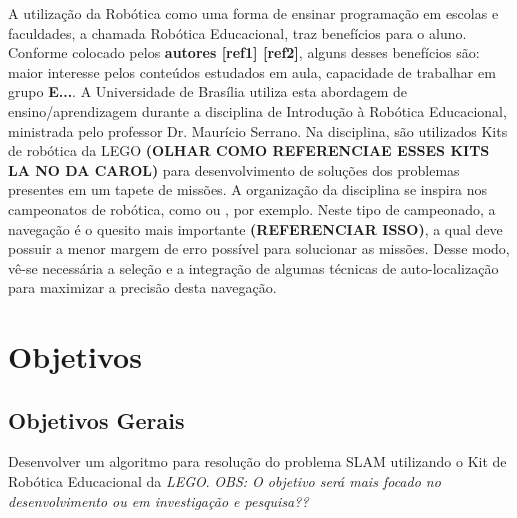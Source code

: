 	A utilização da Robótica como uma forma de ensinar programação em escolas e faculdades, a chamada Robótica Educacional, traz benefícios para o aluno. Conforme colocado pelos \textbf{autores [ref1] [ref2]}, alguns desses benefícios são: maior interesse pelos conteúdos estudados em aula, capacidade de trabalhar em grupo \textbf{E...}. A Universidade de Brasília utiliza esta abordagem de ensino/aprendizagem durante a disciplina de Introdução à Robótica Educacional, ministrada pelo professor Dr. Maurício Serrano. Na disciplina, são utilizados Kits de robótica da LEGO \textbf{(OLHAR COMO REFERENCIAE ESSES KITS LA NO DA CAROL)} para desenvolvimento de soluções dos problemas presentes em um tapete de missões. A organização da disciplina se inspira nos campeonatos de robótica, como \cite{ciber-rato} ou \cite{roboBulldozerIV}, por exemplo. Neste tipo de campeonado, a navegação é o quesito mais importante \textbf{(REFERENCIAR ISSO)}, a qual deve possuir a menor margem de erro possível para solucionar as missões. Desse modo, vê-se necessária a seleção e a integração de algumas técnicas de auto-localização para maximizar a precisão desta navegação.
	




	\section{Objetivos}

	\subsection{Objetivos Gerais} %
	\label{sub:objetivos_gerais}
	
		Desenvolver um algoritmo para resolução do problema SLAM utilizando o Kit de Robótica Educacional da \textit{LEGO}. \textit{OBS: O objetivo será mais focado no desenvolvimento ou em investigação e pesquisa??}

